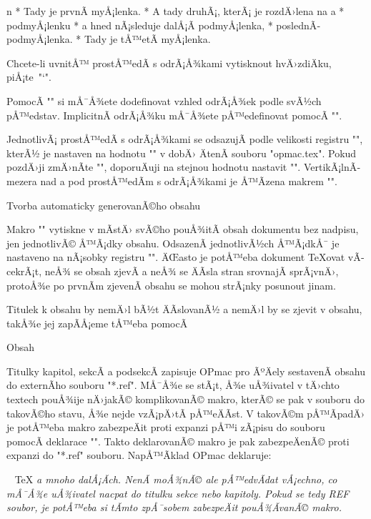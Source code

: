 \begitems \style n
* Tady je prvnÃ­ myÅ¡lenka.
* A tady druhÃ¡, kterÃ¡ je rozdÄ›lena na
  \begitems \style a
  * podmyÅ¡lenku
  * a hned nÃ¡sleduje dalÅ¡Ã­ podmyÅ¡lenka,
  * poslednÃ­ podmyÅ¡lenka.
  \enditems
* Tady je tÅ™etÃ­ myÅ¡lenka.
\enditems

Chcete-li uvnitÅ™ prostÅ™edÃ­ s odrÃ¡Å¾kami vytisknout hvÄ›zdiÄku, piÅ¡te~"\char`\*".

PomocÃ­ "" si mÅ¯Å¾ete dodefinovat vzhled odrÃ¡Å¾ek
podle svÃ½ch pÅ™edstav. ImplicitnÃ­ odrÃ¡Å¾ku mÅ¯Å¾ete pÅ™edefinovat pomocÃ­
"\def\normalitem{<text>}".

JednotlivÃ¡ prostÅ™edÃ­ s odrÃ¡Å¾kami se odsazujÃ­ podle
velikosti registru "\iindent", kterÃ½ je nastaven na hodnotu "\parindent" v
dobÄ› ÄtenÃ­ souboru "opmac.tex". Pokud pozdÄ›ji zmÄ›nÃ­te "\parindent",
doporuÄuji na stejnou hodnotu nastavit "\iindent".
VertikÃ¡lnÃ­ mezera nad a pod prostÅ™edÃ­m s odrÃ¡Å¾kami je Å™Ã­zena makrem
"\iiskip".

\sec Tvorba automaticky generovanÃ©ho obsahu

Makro "\maketoc" vytiskne v mÃ­stÄ› svÃ©ho pouÅ¾itÃ­ obsah dokumentu bez nadpisu,
jen jednotlivÃ© Å™Ã¡dky obsahu. OdsazenÃ­ jednotlivÃ½ch Å™Ã¡dkÅ¯ je nastaveno na
nÃ¡sobky registru "\iindent". ÄŒasto je potÅ™eba dokument \TeX{}ovat vÃ­cekrÃ¡t,
neÅ¾ se obsah zjevÃ­ a neÅ¾ se ÄÃ­sla stran srovnajÃ­ sprÃ¡vnÄ›, protoÅ¾e po
prvnÃ­m zjevenÃ­ obsahu se mohou strÃ¡nky posunout jinam.

Titulek k obsahu by nemÄ›l bÃ½t ÄÃ­slovanÃ½ a nemÄ›l by se zjevit v obsahu, takÅ¾e
jej zapÃ­Å¡eme tÅ™eba pomocÃ­

\begtt
\nonum\notoc\sec Obsah
\endtt

Titulky kapitol, sekcÃ­ a podsekcÃ­ zapisuje OPmac pro ÃºÄely sestavenÃ­ obsahu do
externÃ­ho souboru "*.ref". MÅ¯Å¾e se stÃ¡t, Å¾e uÅ¾ivatel v tÄ›chto textech
pouÅ¾ije nÄ›jakÃ© komplikovanÃ© makro, kterÃ© se pak v souboru  do
takovÃ©ho stavu, Å¾e nejde vzÃ¡pÄ›tÃ­ pÅ™eÄÃ­st. V takovÃ©m pÅ™Ã­padÄ› je potÅ™eba
makro zabezpeÄit proti expanzi pÅ™i zÃ¡pisu do souboru pomocÃ­
deklarace "\addprotect\makro". Takto deklarovanÃ© makro je pak zabezpeÄenÃ©
proti expanzi do "*.ref" souboru. NapÅ™Ã­klad OPmac deklaruje:

\begtt
\addprotect~ \addprotect\TeX \addprotect\thefontsize \addprotect\em
\endtt 
%
a mnoho dalÅ¡Ã­ch. NenÃ­ moÅ¾nÃ© ale pÅ™edvÃ­dat vÅ¡echno, co mÅ¯Å¾e uÅ¾ivatel
nacpat do titulku sekce nebo kapitoly. Pokud se tedy 
REF soubor, je potÅ™eba si tÃ­mto zpÅ¯sobem zabezpeÄit pouÅ¾Ã­vanÃ© makro.

